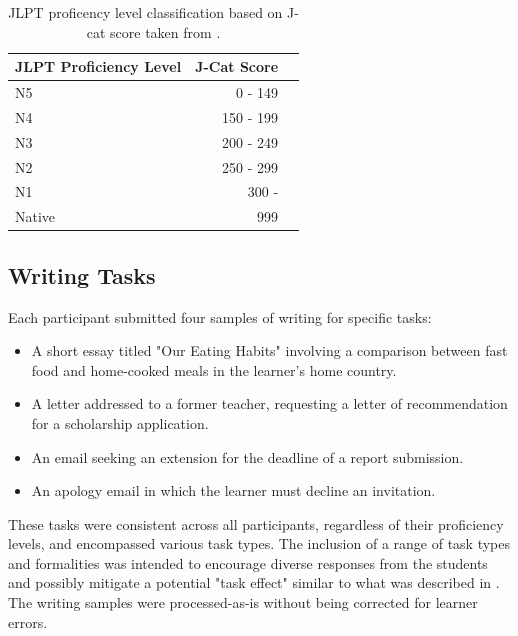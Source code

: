 \begin{table}
\centering
\begin{tabular}{lrl}
\hline \textbf{JLPT Proficiency Level} & \textbf{J-Cat Score}  \\ \hline
N5 & 0 - 149 \\
N4 & 150 - 199 \\
N3 & 200 - 249 \\
N2 & 250 - 299 \\
N1 & 300 - \\
Native & 999
\hline
\end{tabular}
\caption[Proficency Levels]{JLPT proficency level classification based on J-cat score taken from
\cite{jcat_interpretation_guide}.}
\label{tab:proficency-table}
\end{table}

\subsection{Writing Tasks}

Each participant submitted four samples of writing for specific tasks:
\begin{itemize}
    \item A short essay titled "Our Eating Habits" involving a comparison between fast food and home-cooked meals in the learner's home country.
    \item A letter addressed to a former teacher, requesting a letter of recommendation for a scholarship application.
    \item An email seeking an extension for the deadline of a report submission.
    \item An apology email in which the learner must decline an invitation.
\end{itemize}
These tasks were consistent across all participants, regardless of their proficiency levels, and encompassed various
task types. The inclusion of a range of task types and formalities was intended to encourage diverse responses from
the students and possibly mitigate a potential "task effect" similar to what  was described in \cite{Alexpoulou2017}.
The writing samples were processed-as-is without being corrected for learner errors.

